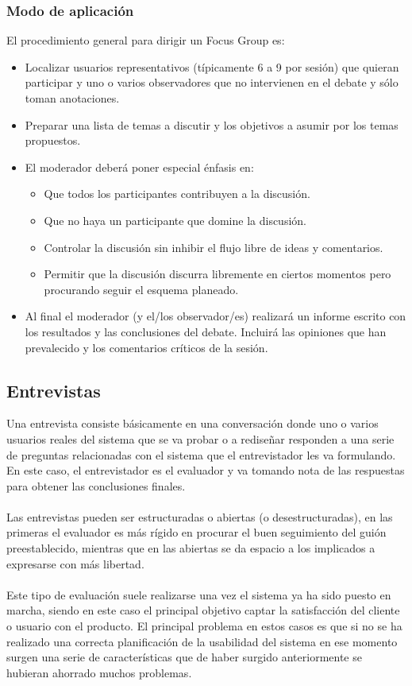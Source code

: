 \subsubsection{Modo de aplicación}
El procedimiento general para dirigir un Focus Group es:
\begin{itemize}
    \item Localizar usuarios representativos (típicamente 6 a 9 por sesión) que quieran participar y uno o varios observadores que no intervienen en el debate y sólo toman anotaciones.
    \item Preparar una lista de temas a discutir y los objetivos a asumir por los temas propuestos.
    \item El moderador deberá poner especial énfasis en:
    \begin{itemize}
        \item Que todos los participantes contribuyen a la discusión.
        \item Que no haya un participante que domine la discusión.
        \item Controlar la discusión sin inhibir el flujo libre de ideas y comentarios.
        \item Permitir que la discusión discurra libremente en ciertos momentos pero procurando seguir el esquema planeado.
    \end{itemize}
    \item Al final el moderador (y el/los observador/es) realizará un informe escrito con los resultados y las conclusiones del debate. Incluirá las opiniones que han prevalecido y los comentarios críticos de la sesión.
\end{itemize}

\subsection{Entrevistas}
Una entrevista consiste básicamente en una conversación donde uno o varios usuarios reales del sistema que se va probar o a rediseñar responden a una serie de preguntas relacionadas con el sistema que el entrevistador les va formulando. En este caso, el entrevistador es el evaluador y va tomando nota de las respuestas para obtener las conclusiones finales. \\ \\
Las entrevistas pueden ser estructuradas o abiertas (o desestructuradas), en las primeras el evaluador es más rígido en procurar el buen seguimiento del guión preestablecido, mientras que en las abiertas se da espacio a los implicados a expresarse con más libertad.  \\ \\
Este tipo de evaluación suele realizarse una vez el sistema ya ha sido puesto en marcha, siendo en este caso el principal objetivo captar la satisfacción del cliente o usuario con el producto. El principal problema en estos casos es que si no se ha realizado una correcta planificación de la usabilidad del sistema en ese momento surgen una serie de características que de haber surgido anteriormente se hubieran ahorrado muchos problemas.

